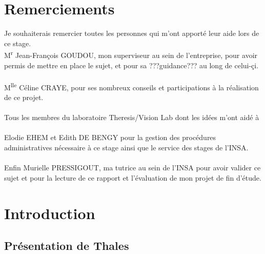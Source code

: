\documentclass[12pt]{article}
\begin{document}
\tableofcontents
\pagebreak
\section{Remerciements}
Je souhaiterais remercier toutes les personnes qui m'ont apporté leur aide lors de ce stage.\\
M\textsuperscript{r} Jean-François GOUDOU, mon superviseur au sein de l'entreprise, pour avoir permis de mettre en place le sujet, et pour sa ???guidance??? au long de celui-çi.\\
\\
M\textsuperscript{lle} Céline CRAYE, pour ses nombreux conseils et participations à la réalisation de ce projet.\\
\\
Tous les membres du laboratoire Theresis/Vision Lab dont les idées m'ont aidé à \\
\\
Elodie EHEM et Edith DE BENGY pour la gestion des procédures administratives nécessaire à ce stage ainsi que le service des stages de l'INSA.\\
\\
Enfin Murielle PRESSIGOUT, ma tutrice au sein de l'INSA pour avoir valider ce sujet et pour la lecture de ce rapport et l'évaluation de mon projet de fin d'étude.
\pagebreak
\section{Introduction}
\subsection{Présentation de Thales}
\end{document}
